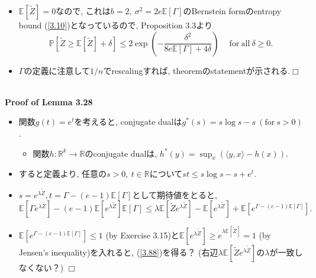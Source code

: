 \documentclass[aspectratio=169, dvipdfmx]{beamer}
\def\qed{\hfill $\Box$}
\newcommand{\ex}{\mathbb{E}}
\newcommand{\bb}{\mathbb}
\begin{document}
\begin{frame}
    \begin{itemize}
        \item $\ex[\widetilde{Z}] = 0$なので, これは$b = 2,\ \sigma^2 = 2e\ex[\Gamma]$のBernstein formのentropy bound (\ref{3.10})となっているので,
        Proposition 3.3より
        \[
            \bb{P}\left[\widetilde{Z} \ge \ex[\widetilde{Z}] +\delta\right]
            \le 2 \exp\left(-\frac{\delta^2}{8e\ex[\Gamma] + 4\delta} \right)
            \quad \mathrm{\ for\ all\ } \delta \ge 0.
        \]
        \item $\Gamma$の定義に注意して$1/n$でrescalingすれば, theoremのstatementが示される.\qed
    \end{itemize}
　\\
{\bf Proof of Lemma 3.28}
\begin{itemize}
    \item 関数$g(t) = e^t$を考えると, conjugate dualは$g^*(s) = s\log s - s\ (\mathrm{for\ }s>0)$.
        \begin{itemize}
            \item 関数$h:\bb{R}^k\to\bb{R}$のconjugate dualは, $h^*(y) = \sup_{x}\left(\langle y, x\rangle - h(x) \right)$.
        \end{itemize}
    \item すると定義より, 任意の$s > 0,\ t\in \bb{R}$について$st \le s\log s - s + e^t$.
    \item $s = e^{\lambda \widetilde{Z}}, t = \Gamma - (e-1) \ex[\Gamma]$として期待値をとると,
    \[
        \ex[\Gamma e^{\lambda \widetilde{Z}}] - (e-1) \ex[e^{\lambda \widetilde{Z}}]\ex[\Gamma]
        \le \lambda\ex[\widetilde{Z} e^{\lambda \widetilde{Z}}] - \ex[e^{\lambda \widetilde{Z}}] + \ex[e^{\Gamma - (e-1) \ex[\Gamma]}].
    \]
    \item $\ex[e^{\Gamma - (e-1)\ex[\Gamma]}] \le 1$ (by Exercise 3.15)と$\ex[e^{\lambda \widetilde{Z}}] \ge e^{\lambda \ex[\widetilde{Z}]} = 1$ (by Jensen's inequality)を入れると, (\ref{3.88})を得る？ (右辺$\lambda\ex[\widetilde{Z} e^{\lambda \widetilde{Z}}]$の$\lambda$が一致しなくない？)
    \qed
\end{itemize}
\end{frame}
\end{document}
